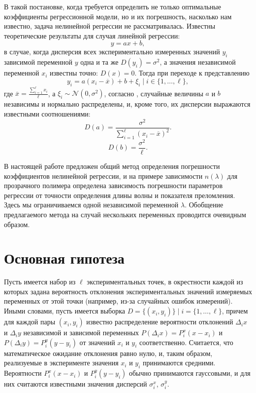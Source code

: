 \documentclass[11pt,a4paper]{article}
\theoremstyle{definition}
\begin{document}
В такой постановке, когда требуется определить не только
оптимальные коэффициенты регрессионной модели, но и их погрешность, насколько нам
известно, задача нелинейной регрессии не рассматривалась. Известны
теоретические результаты для случая линейной регрессии:
\[
  y = ax + b,
\]
в случае, когда дисперсия всех экспериментально измеренных значений $y_i$
зависимой переменной $y$ одна и та же $D(y_i) = \sigma^2$, а значения независимой
переменной $x_i$ известны точно: $D(x) = 0$. Тогда при переходе к представлению
\[
  y_i = a(x_i - \overline{x}) + b + \xi_i \mid i \in \{ 1, \dots, \ell \},
\]
где $\overline{x} = \frac{\sum_{i = 1}^\ell x_i}{\ell}$, а $\xi_i \sim \mathcal{N}(0, \sigma^2)$,
согласно \cite{Vatunin05}, случайные величины $a$ и $b$ независимы
и нормально распределены, и, кроме того, их дисперсии выражаются известными соотношениями:
\begin{equation}
  \label{eq:classic_da}
  D(a) = \frac{\sigma^2}{\sum_{i = 1}^\ell (x_i - \overline{x})^2}.
\end{equation}
\begin{equation}
  \label{eq:classic_db}
  D(b) = \frac{\sigma^2}{\ell}.
\end{equation}

В настоящей работе предложен общий метод определения
погрешности коэффициентов нелинейной регрессии, и на примере зависимости
$n(\lambda)$ для прозрачного полимера определена зависимость погрешности
параметров регрессии от точности определения длины волны и показателя
преломления. Здесь мы ограничиваемся одной
независимой переменной $\lambda$. Обобщение предлагаемого метода на случай
нескольких переменных проводится очевидным образом.

\section{Основная гипотеза}

Пусть имеется набор из $\ell$ экспериментальных точек, в окрестности каждой из
которых задана вероятность отклонения экспериментальных значений 
измеряемых переменных от этой точки (например, из-за случайных ошибок
измерений).
Иными словами, пусть имеется выборка $D = \{ (x_i, y_i) \} \mid i = \{ 1, \dots, \ell \}$,
причем для каждой пары $(x_i, y_i)$ известно распределение вероятности отклонений
$\Delta_i x$ и $\Delta_i y$ независимой и зависимой переменных $P(\Delta_i x) = P_i^x(x - x_i)$ и
$P(\Delta_i y) = P_i^y(y - y_i)$ от значений $x_i$ и $y_i$ соответственно. Считается,
что математическое ожидание отклонения равно нулю, и, таким образом, реализуемые
в эксперименте значения $x_i$ и $y_i$ принимаются средними.
Вероятности $P_i^x(x - x_i)$ и
$P_i^y(y - y_i)$ обычно принимаются гауссовыми, и для них
считаются известными значения дисперсий $\sigma_i^x$, $\sigma_i^y$.
\end{document}
